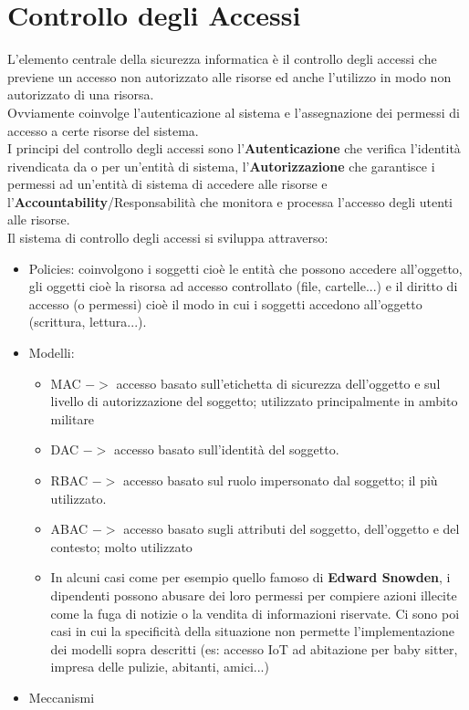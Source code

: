 \section{Controllo degli Accessi}
L'elemento centrale della sicurezza informatica è il controllo degli accessi che previene un accesso non autorizzato alle risorse ed anche l'utilizzo in modo non autorizzato di una risorsa.\\
Ovviamente coinvolge l'autenticazione al sistema e l'assegnazione dei permessi di accesso a certe risorse del sistema.\\
I principi del controllo degli accessi sono l'\textbf{Autenticazione} che verifica l'identità rivendicata da o per un'entità di sistema, l'\textbf{Autorizzazione} che garantisce i permessi ad un'entità di sistema di accedere alle risorse e l'\textbf{Accountability}/Responsabilità che monitora e processa l'accesso degli utenti alle risorse.\\
Il sistema di controllo degli accessi si sviluppa attraverso:
\begin{itemize}[noitemsep]
    \item Policies: coinvolgono i soggetti cioè le entità che possono accedere all'oggetto, gli oggetti cioè la risorsa ad accesso controllato (file, cartelle...) e il diritto di accesso (o permessi) cioè il modo in cui i soggetti accedono all'oggetto (scrittura, lettura...).
    \item Modelli:
    \begin{itemize}[noitemsep]
        \item \acrfull{MAC} $->$ accesso basato sull'etichetta di sicurezza dell'oggetto e sul livello di autorizzazione del soggetto; utilizzato principalmente in ambito militare
        \item \acrfull{DAC} $->$ accesso basato sull'identità del soggetto.
        \item \acrfull{RBAC} $->$ accesso basato sul ruolo impersonato dal soggetto; il più utilizzato.
        \item \acrfull{ABAC} $->$ accesso basato sugli attributi del soggetto, dell'oggetto e del contesto; molto utilizzato
        \item In alcuni casi come per esempio quello famoso di \textbf{Edward Snowden}, i dipendenti possono abusare dei loro permessi per compiere azioni illecite come la fuga di notizie o la vendita di informazioni riservate. Ci sono poi casi in cui la specificità della situazione non permette l'implementazione dei modelli sopra descritti (es: accesso \acrshort{IoT} ad abitazione per baby sitter, impresa delle pulizie, abitanti, amici...)
    \end{itemize}
    \item Meccanismi
\end{itemize}

